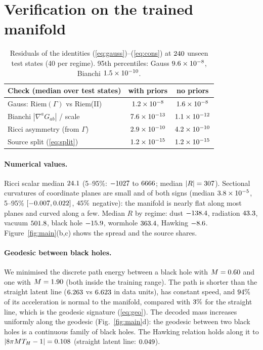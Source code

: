 \documentclass[10pt,twocolumn]{article}
\begin{document}
\section{Verification on the trained manifold}
\begin{table}[h]\centering\small
\begin{tabular}{@{}lcc@{}}\toprule
Check (median over test states) & with priors & no priors\\\midrule
Gauss: Riem$(\Gamma)$ vs Riem(II) & $1.2\times10^{-8}$ & $1.6\times10^{-8}$\\
Bianchi $|\nabla^aG_{ab}|$ / scale & $7.6\times10^{-13}$ & $1.1\times10^{-12}$\\
Ricci asymmetry (from $\Gamma$) & $2.9\times10^{-10}$ & $4.2\times10^{-10}$\\
Source split (\ref{eq:split}) & $1.2\times10^{-15}$ & $1.2\times10^{-15}$\\\bottomrule
\end{tabular}
\caption{Residuals of the identities (\ref{eq:gauss})--(\ref{eq:cons}) at $240$ unseen test
states (40 per regime). 95th percentiles: Gauss $9.6\times10^{-8}$, Bianchi $1.5\times10^{-10}$.}
\label{tab:checks}
\end{table}

\paragraph{Numerical values.} Ricci scalar median $24.1$ (5--95\%: $-1027$ to $6666$; median
$|R|=307$). Sectional curvatures of coordinate planes are small and of both signs (median
$3.8\times10^{-5}$, 5--95\% $[-0.007,0.022]$, $45\%$ negative): the manifold is nearly flat along most
planes and curved along a few. Median $R$ by regime: dust $-138.4$, radiation $43.3$,
vacuum $501.8$, black hole $-15.9$, wormhole $363.4$, Hawking $-8.6$.
Figure~\ref{fig:main}(b,c) shows the spread and the source shares.

\paragraph{Geodesic between black holes.} We minimised the discrete path energy between a black
hole with $M=0.60$ and one with $M=1.90$ (both inside the training range). The path is
shorter than the straight latent line ($6.263$ vs $6.623$ in data units), has constant speed,
and $94\%$ of its acceleration is normal to the manifold, compared with $3\%$ for
the straight line, which is the geodesic signature (\ref{eq:geo}). The decoded mass increases
uniformly along the geodesic (Fig.~\ref{fig:main}d): the geodesic between two black holes is a
continuous family of black holes. The Hawking relation holds along it to
$|8\pi M T_H-1|=0.108$ (straight latent line: $0.049$).
\end{document}
